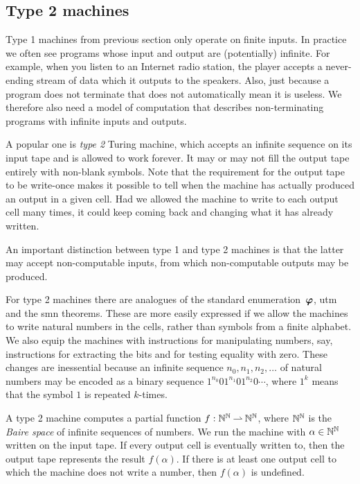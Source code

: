 \subsection{Type 2 machines}
\label{sec:type-2}

Type 1 machines from previous section only operate on finite inputs.
In practice we often see programs whose input and output are
(potentially) infinite. For example, when you listen to an Internet
radio station, the player accepts a never-ending stream of data which
it outputs to the speakers. Also, just because a program does not
terminate that does not automatically mean it is useless. We therefore
also need a model of computation that describes non-terminating
programs with infinite inputs and outputs.

A popular one is \emph{type 2} Turing machine, which accepts an
infinite sequence on its input tape and is allowed to work forever. It
may or may not fill the output tape entirely with non-blank symbols.
Note that the requirement for the output tape to be write-once makes
it possible to tell when the machine has actually produced an output
in a given cell. Had we allowed the machine to write to each output
cell many times, it could keep coming back and changing what it has
already written.

An important distinction between type 1 and type 2 machines is that
the latter may accept non-computable inputs, from which non-computable
outputs may be produced.

For type 2 machines there are analogues of the standard
enumeration~$\text{\boldmath{$\varphi$}}$, utm and the smn theorems. These are more easily
expressed if we allow the machines to write natural numbers in the
cells, rather than symbols from a finite alphabet. We also equip the
machines with instructions for manipulating numbers, say, instructions
for extracting the bits and for testing equality with zero. These
changes are inessential because an infinite sequence $n_0, n_1, n_2,
\ldots$ of natural numbers may be encoded as a binary sequence
$1^{n_0}01^{n_1}01^{n_2}0\cdots$, where $1^k$ means that the symbol
$1$ is repeated $k$-times.

A type 2 machine computes a partial function $f : \mathbb{N}^{\mathbb{N}} \mathbin{\rightharpoonup}
\mathbb{N}^{\mathbb{N}}$, where $\mathbb{N}^{\mathbb{N}}$ is the \emph{Baire space} of infinite
sequences of numbers. We run the machine with $\alpha \in \mathbb{N}^{\mathbb{N}}$
written on the input tape. If every output cell is eventually written
to, then the output tape represents the result $f(\alpha)$. If there is
at least one output cell to which the machine does not write a number,
then $f(\alpha)$ is undefined.

